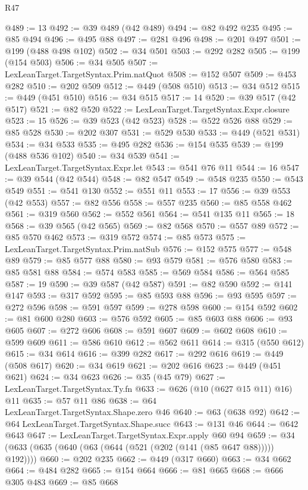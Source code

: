 \begin{lexlean}{R47}
\begin{coremodule}
@489 := 13
@492 := @39 @489 (@42 @489)
@494 := @82 @492 @235
@495 := @85 @494
@496 := @495 @88
@497 := @281 @496
@498 := @201 @497
@501 := @199 (@488 @498 @102)
@502 := @34 @501
@503 := @292 @282
@505 := @199 (@154 @503)
@506 := @34 @505
@507 := LexLeanTarget.TargetSyntax.Prim.natQuot
@508 := @152 @507
@509 := @453 @282
@510 := @202 @509
@512 := @449 (@508 @510)
@513 := @34 @512
@515 := @449 (@451 @510)
@516 := @34 @515
@517 := 14
@520 := @39 @517 (@42 @517)
@521 := @82 @520
@522 := LexLeanTarget.TargetSyntax.Expr.closure
@523 := 15
@526 := @39 @523 (@42 @523)
@528 := @522 @526 @88
@529 := @85 @528
@530 := @202 @307
@531 := @529 @530
@533 := @449 (@521 @531)
@534 := @34 @533
@535 := @495 @282
@536 := @154 @535
@539 := @199 (@488 @536 @102)
@540 := @34 @539
@541 := LexLeanTarget.TargetSyntax.Expr.let
@543 := @541 @76 @11
@544 := 16
@547 := @39 @544 (@42 @544)
@548 := @82 @547
@549 := @548 @235
@550 := @543 @549
@551 := @541 @130
@552 := @551 @11
@553 := 17
@556 := @39 @553 (@42 @553)
@557 := @82 @556
@558 := @557 @235
@560 := @85 @558 @462
@561 := @319 @560
@562 := @552 @561
@564 := @541 @135 @11
@565 := 18
@568 := @39 @565 (@42 @565)
@569 := @82 @568
@570 := @557 @89
@572 := @85 @570 @462
@573 := @319 @572
@574 := @85 @573
@575 := LexLeanTarget.TargetSyntax.Prim.natSub
@576 := @152 @575
@577 := @548 @89
@579 := @85 @577 @88
@580 := @93 @579
@581 := @576 @580
@583 := @85 @581 @88
@584 := @574 @583
@585 := @569 @584
@586 := @564 @585
@587 := 19
@590 := @39 @587 (@42 @587)
@591 := @82 @590
@592 := @141 @147
@593 := @317 @592
@595 := @85 @593 @88
@596 := @93 @595
@597 := @272 @596
@598 := @591 @597
@599 := @278 @598
@600 := @154 @592
@602 := @81 @600 @280
@603 := @576 @592
@605 := @85 @603 @88
@606 := @93 @605
@607 := @272 @606
@608 := @591 @607
@609 := @602 @608
@610 := @599 @609
@611 := @586 @610
@612 := @562 @611
@614 := @315 (@550 @612)
@615 := @34 @614
@616 := @399 @282
@617 := @292 @616
@619 := @449 (@508 @617)
@620 := @34 @619
@621 := @202 @616
@623 := @449 (@451 @621)
@624 := @34 @623
@626 := @35 (@45 @79)
@627 := LexLeanTarget.TargetSyntax.Ty.fn
@633 := @626 (@10 (@627 @15 @11) @16) @11
@635 := @57 @11 @86
@638 := @64 LexLeanTarget.TargetSyntax.Shape.zero @46
@640 := @63 (@638 @92)
@642 := @64 LexLeanTarget.TargetSyntax.Shape.succ
@643 := @131 @46
@644 := @642 @643
@647 := LexLeanTarget.TargetSyntax.Expr.apply @60 @94
@659 := @34 (@633 (@635 (@640 (@63 (@644 (@521 (@202 (@141 (@85 @647 @88))))) @192))))
@660 := @202 @235
@662 := @449 (@317 @660)
@663 := @34 @662
@664 := @484 @282
@665 := @154 @664
@666 := @81 @665
@668 := @666 @305 @483
@669 := @85 @668

\end{coremodule}
\end{lexlean}
